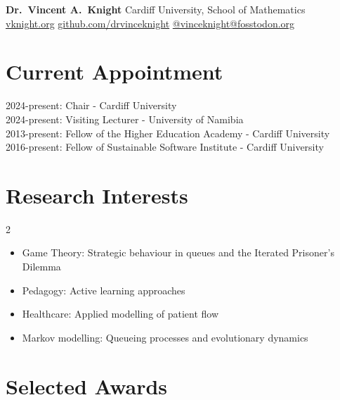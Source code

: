 \documentclass[10pt]{article}
\begin{document}
{\Large \textbf{Dr.\ Vincent A.\ Knight}} \hfill
Cardiff University, School of Mathematics\\
\href{https://vknight.org}{vknight.org} \quad
\href{https://github.com/drvinceknight}{github.com/drvinceknight} \quad
\href{https://fosstodon.org/@vinceknight}{@vinceknight@fosstodon.org}

\medskip

\section{Current Appointment}

2024-present: Chair - Cardiff University \\
2024-present: Visiting Lecturer - University of Namibia \\
2013-present: Fellow of the Higher Education Academy - Cardiff University \\
2016-present: Fellow of Sustainable Software Institute - Cardiff University \\


\section{Research Interests}

\begin{multicols}{2}
\begin{itemize}

  \item Game Theory: Strategic behaviour in queues and the Iterated Prisoner's Dilemma

  \item Pedagogy: Active learning approaches

  \item Healthcare: Applied modelling of patient flow

  \item Markov modelling: Queueing processes and evolutionary dynamics

\end{itemize}
\end{multicols}

\section{Selected Awards}
\end{document}
